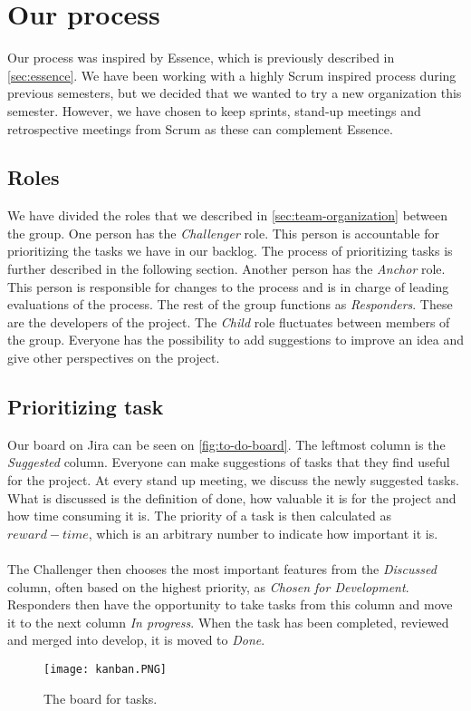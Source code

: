 \section{Our process}
Our process was inspired by Essence, which is previously described in \autoref{sec:essence}.
We have been working with a highly Scrum inspired process during previous semesters, but we decided that we wanted to try a new organization this semester.
However, we have chosen to keep sprints, stand-up meetings and retrospective meetings from Scrum as these can complement Essence.

\subsection{Roles}
We have divided the roles that we described in \autoref{sec:team-organization} between the group.
One person has the \textit{Challenger} role.
This person is accountable for prioritizing the tasks we have in our backlog.
The process of prioritizing tasks is further described in the following section.
Another person has the \textit{Anchor} role.
This person is responsible for changes to the process and is in charge of leading evaluations of the process.
The rest of the group functions as \textit{Responders}.
These are the developers of the project.
The \textit{Child} role fluctuates between members of the group.
Everyone has the possibility to add suggestions to improve an idea and give other perspectives on the project.

\subsection{Prioritizing task}
Our board on Jira can be seen on \autoref{fig:to-do-board}.
The leftmost column is the \textit{Suggested} column.
Everyone can make suggestions of tasks that they find useful for the project.
At every stand up meeting, we discuss the newly suggested tasks.
What is discussed is the definition of done, how valuable it is for the project and how time consuming it is.
The priority of a task is then calculated as $reward - time$, which is an arbitrary number to indicate how important it is.
\\\\
The Challenger then chooses the most important features from the \textit{Discussed} column, often based on the highest priority, as \textit{Chosen for Development}.
Responders then have the opportunity to take tasks from this column and move it to the next column \textit{In progress}.
When the task has been completed, reviewed and merged into develop, it is moved to \textit{Done}.
\begin{figure}[H]
    \centering
    \texttt{[image: kanban.PNG]}
    \caption{The board for tasks.}
    \label{fig:to-do-board}
\end{figure}

